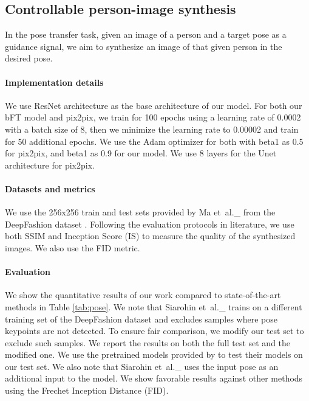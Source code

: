 \documentclass[10pt,twocolumn,letterpaper]{article}
\def\etal{et~al.\_}			  \def\eg{e.g.,~}               \def\ie{i.e.,~}               \def\etc{etc}                 \def\cf{cf.~}                 \def\viz{viz.~}               \def\vs{vs.~}
\newlength\paramargin
\begin{document}
\subsection{Controllable person-image synthesis}
In the pose transfer task, given an image of a person and a target pose as a guidance signal, we aim to synthesize an image of that given person in the desired pose.

\vspace{\paramargin} \paragraph{Implementation details} We use ResNet architecture as the base architecture of our model. For both our bFT model and pix2pix, we train for 100 epochs using a learning rate of 0.0002 with a batch size of 8, then we minimize the learning rate to 0.00002 and train for 50 additional epochs. We use the Adam optimizer for both with beta1 as 0.5 for pix2pix, and beta1 as 0.9 for our model. 
We use 8 layers for the Unet architecture for pix2pix.


\vspace{\paramargin} \paragraph{Datasets and metrics} We use the 256x256 train and test sets provided by Ma \etal\cite{ma2017pose} from the DeepFashion dataset \cite{liu2016deepfashion}. Following the evaluation protocols in literature, we use both SSIM and Inception Score (IS) to measure the quality of the synthesized images. We also use the FID metric.

\vspace{\paramargin} \paragraph{Evaluation}
We show the quantitative results of our work compared to state-of-the-art methods in Table \ref{tab:pose}. We note that Siarohin \etal\cite{siarohin2018deformable} trains on a different training set of the DeepFashion dataset and excludes samples where pose keypoints are not detected. To ensure fair comparison, we modify our test set to exclude such samples. We report the results on both the full test set and the modified one. We use the pretrained models provided by \cite{siarohin2018deformable,ma2017pose} to test their models on our test set. We also note that Siarohin \etal\cite{siarohin2018deformable} uses the input pose as an additional input to the model. We show favorable results against other methods using the Frechet Inception Distance (FID).
\end{document}
